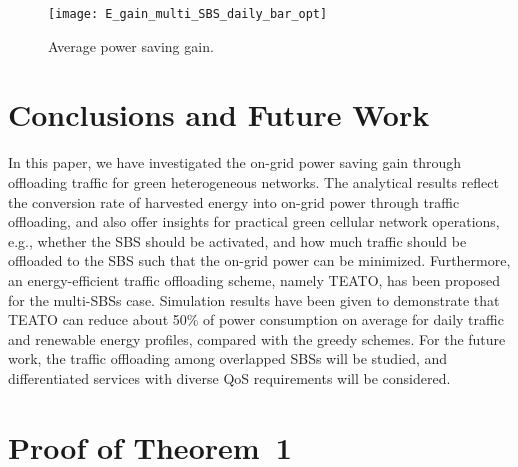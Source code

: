 \documentclass[12pt, draftclsnofoot,onecolumn]{IEEEtran}
\begin{document}
\begin{figure}[t]
	\centering
	\texttt{[image: E\_gain\_multi\_SBS\_daily\_bar\_opt]}
	\caption{Average power saving gain.}\label{fig_network_gain_daily_bar}
\end{figure}
 \section{Conclusions and Future Work}
    \label{sec_conclusions}

    In this paper, we have investigated the on-grid power saving gain through offloading traffic for green
    heterogeneous networks.
    The analytical results reflect the conversion rate of harvested energy into on-grid power through traffic offloading, and also offer insights for practical green cellular  network operations, e.g., whether the SBS should be activated, and how much traffic should be offloaded to the SBS such that the on-grid power can be minimized.
    Furthermore, an energy-efficient traffic offloading scheme, namely TEATO, has been proposed for the multi-SBSs case.
    Simulation results have been given to demonstrate that TEATO can reduce about 50\% of power consumption on average for daily traffic and renewable energy profiles, compared with the greedy schemes.
    For the future work, the traffic offloading among overlapped SBSs will be studied, and differentiated services with diverse QoS requirements will be considered.


\appendices{}
   \section{Proof of Theorem~1}
    \label{appendix_SBS}
\end{document}
